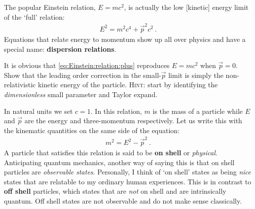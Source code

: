 \documentclass[12pt, oneside]{report}    %
\begin{document}
The popular Einstein relation, $E = mc^2$, is actually the low [kinetic] energy limit of the `full' relation:
\begin{align}
    E^2 = m^2 c^4 + \vec{p}^2 c^2 \ .
    \label{eq:Einstein:relation:plus}
\end{align}
Equations that relate energy to momentum show up all over physics and have a special name: \textbf{dispersion relations}. 
\begin{exercise}
It is obvious that \eqref{eq:Einstein:relation:plus} reproduces $E=mc^2$ when $\vec{p}=0$. Show that the leading order correction in the small-$\vec{p}$ limit is simply the non-relativistic kinetic energy of the particle. \textsc{Hint:} start by identifying the \emph{dimensionless} small parameter and Taylor expand.
\end{exercise}
In natural units we set $c=1$. In this relation, $m$ is the mass of a particle while $E$ and $\vec{p}$ are the energy and three-momentum respectively. Let us write this with the kinematic quantities on the same side of the equation:
\begin{align}
    m^2 = E^2 - \vec{p}^2 \ .
    \label{eq:on:shell}
\end{align}
A particle that satisfies this relation is said to be \textbf{on shell} or \emph{physical}. Anticipating quantum mechanics, another way of saying this is that on shell particles are \emph{observable states}. Personally, I think of `on shell' states as being \emph{nice} states that are relatable to my ordinary human experiences. This is in contrast to \textbf{off shell} particles, which states that are \emph{not} on shell and are intrinsically quantum. Off shell states are not observable and do not make sense classically. 
\end{document}
